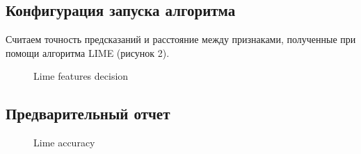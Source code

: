 \documentclass[12pt]{article}
\begin{document}
\subsection{Конфигурация запуска алгоритма}

Считаем точность предсказаний и расстояние между признаками, полученные при помощи алгоритма LIME \cite{ribeiro2016why} (рисунок 2). 

\begin{figure}
 \caption{Lime features decision}
  \label{fig:1}
\end{figure}

\subsection{Предварительный отчет}

\begin{figure}
\caption{Lime accuracy}
\label{fig:image}
\end{figure}
\end{document}
